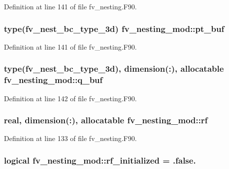 Definition at line 141 of file fv\-\_\-nesting.\-F90.

\subsubsection[{pt\-\_\-buf}]{\setlength{\rightskip}{0pt plus 5cm}type(fv\-\_\-nest\-\_\-bc\-\_\-type\-\_\-3d) fv\-\_\-nesting\-\_\-mod\-::pt\-\_\-buf}\label{classfv__nesting__mod_abe6a968e2acd11ea1839969781f8b189}


Definition at line 141 of file fv\-\_\-nesting.\-F90.

\subsubsection[{q\-\_\-buf}]{\setlength{\rightskip}{0pt plus 5cm}type(fv\-\_\-nest\-\_\-bc\-\_\-type\-\_\-3d), dimension(\-:), allocatable fv\-\_\-nesting\-\_\-mod\-::q\-\_\-buf}\label{classfv__nesting__mod_acc3bcff2425434680476295e500da917}


Definition at line 142 of file fv\-\_\-nesting.\-F90.

\subsubsection[{rf}]{\setlength{\rightskip}{0pt plus 5cm}real, dimension(\-:), allocatable fv\-\_\-nesting\-\_\-mod\-::rf}\label{classfv__nesting__mod_a702e9b795503ff62634ce6101630bf11}


Definition at line 133 of file fv\-\_\-nesting.\-F90.

\subsubsection[{rf\-\_\-initialized}]{\setlength{\rightskip}{0pt plus 5cm}logical fv\-\_\-nesting\-\_\-mod\-::rf\-\_\-initialized = .false.}\label{classfv__nesting__mod_a98a38c57118fae2095e4a502840edc87}


